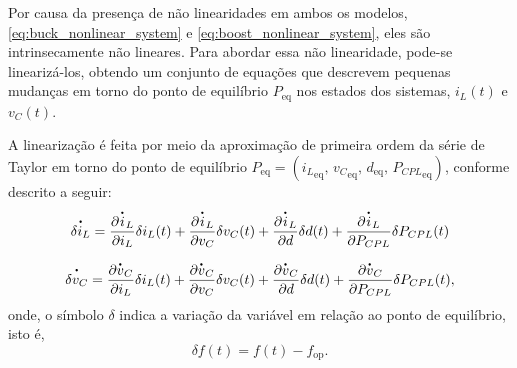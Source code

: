 Por causa da presença de não linearidades em ambos os modelos, \eqref{eq:buck_nonlinear_system} e \eqref{eq:boost_nonlinear_system}, eles são intrinsecamente não lineares. Para abordar essa não linearidade, pode-se linearizá-los, obtendo um conjunto de equações que descrevem pequenas mudanças em torno do ponto de equilíbrio $P_{\text{eq}}$ nos estados dos sistemas, $i_L(t)$ e $v_C(t)$.

A linearização é feita por meio da aproximação de primeira ordem da série de Taylor em torno do ponto de equilíbrio $P_{\text{eq}} = ({i_L}_{\text{eq}}, \, {v_C}_{\text{eq}}, \, {d}_{\text{eq}}, \, {P_{CPL}}_{\text{eq}})$, conforme descrito a seguir: \begin{gather}  \dt{\delta i_L} = \frac{\partial \dt{i}_L}{\partial i_L}\delta i_L(t) + \frac{\partial \dt{i}_L}{\partial v_C}\delta v_C(t) + \frac{\partial {\dt{i}_L}}{\partial d}\delta d(t) + \frac{\partial {\dt{i}_L}}{\partial P_{CPL}}\delta P_{CPL}(t) \\ \nonumber \\ \dt{\delta v_C} = \frac{\partial \dt{v}_C}{\partial i_L}\delta i_L(t) + \frac{\partial \dt{v}_C}{\partial v_C}\delta v_C(t) + \frac{\partial \dt{v}_C}{\partial d}\delta d(t) + \frac{\partial \dt{v}_C}{\partial P_{CPL}}\delta P_{CPL}(t), \end{gather} onde, o símbolo $\delta$ indica a variação da variável em relação ao ponto de equilíbrio, isto é, \begin{equation} \delta f(t) = f(t) - f_{\text{op}}. \label{eq:delta}\end{equation}

